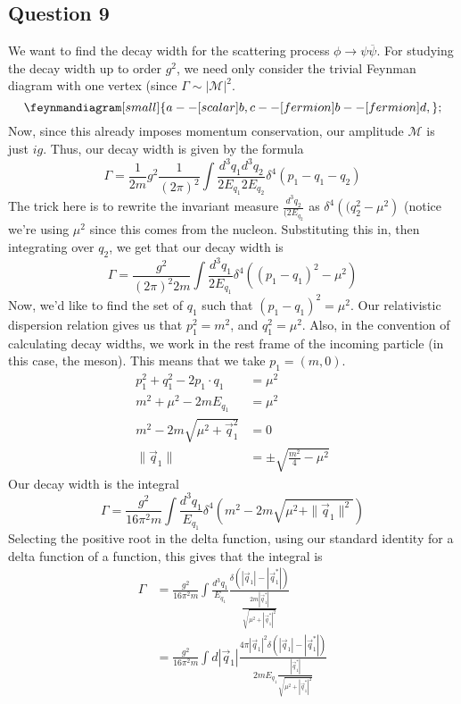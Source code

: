 \subsection{Question 9} 
We want to find the decay width 
for the scattering process $ \phi \to \psi \overline{ \psi } $. 
For studying the decay width up to order $ g ^ 2 $, 
we need only consider the trivial Feynman diagram with 
one vertex (since $ \Gamma \sim | \mathcal{ M } | ^ 2 $.  
\begin{equation*}
\feynmandiagram[small]{
	a -- [scalar] b, 
	c -- [fermion] b -- [fermion] d, 
}; 
\end{equation*}
Now, since this already imposes momentum conservation, 
our amplitude $\mathcal{ M } $ is just $  i g  $.
Thus, our decay width is given by the formula 
\[
\Gamma = \frac{1}{2m } g ^ 2 \frac{1}{( 2 \pi ) ^ 2}  \int 
\frac{d ^ 3 q_1  d ^ 3 q_2 }{ 2 E _{ q_1 } 2 E _{ q_2 } } \delta ^ 4 ( p_1- q_1 - q_2) 
\] The trick here is to 
rewrite the invariant measure $ \frac{ d ^ 3 q_2 }{ ( 2 E_{ q_2 } }$ as $  \delta^ 4 \left(  
( q_2 ^ 2 - \mu ^ 2 \right)  $ (notice we're using $ \mu ^ 2 $ since this 
comes from the nucleon. 
Substituting this in, then integrating over $ q_2 $, 
we get that our decay width is 
\[
\Gamma = \frac{g ^ 2 }{ ( 2 \pi ) ^ 2 2m } \int \frac{d ^ 3 q_1 }{ 2 E_{ q_1 } } \delta ^  4
\left(  ( p_1 - q_1 ) ^ 2  - \mu ^ 2  \right) 
\] Now, we'd like to find the set of $ q_1 $ such that $ ( p_1 - q_1 ) ^ 2  = \mu ^ 2 $. 
Our relativistic dispersion relation gives us that $ p_1 ^ 2 = m ^ 2 $, 
and $q_1 ^ 2 = \mu ^ 2 $. Also, in the convention of calculating 
decay widths, we work in the rest frame of the incoming particle (in this case, 
the meson). This means that we take $ p_1 = ( m , 0 ) $. 
\begin{align*}
p_1 ^ 2 + q_1 ^ 2 - 2 p_1 \cdot  q_1  &=  \mu ^ 2 \\
m ^ 2 + \mu ^ 2  - 2 m E_{ q_1 }  &= \mu ^ 2 \\
m ^ 2  - 2m \sqrt{ \mu ^ 2 + \vec{q} _ 1 ^ 2 } &=  0  \\
\| \vec{q} _ 1 \|  & = \pm \sqrt{ \frac{m ^ 2 }{ 4 }  - \mu ^ 2 } 
\end{align*}
Our decay width is the integral 
\[
\Gamma = \frac{g ^ 2 }{ 16 \pi ^ 2 m } \int \frac{d ^ 3 q_1 }{ E_{ q_1 } } \delta ^ 4 \left(  
m ^ 2- 2m \sqrt{ \mu ^ 2 + \| \vec{q} _ 1 \| ^ 2 } \right) 
\] Selecting the positive root in the delta function, using 
our standard identity for a delta function of a function, this 
gives that the integral is 
\begin{align*} 
\Gamma & = \frac{g ^ 2 }{ 16 \pi ^ 2 m } \int \frac{d ^ 3 q_1 }{ E_{ q_1 } } 
\frac{\delta \left(  | \vec{q} _ 1 |   - | \vec{q} _ 1 ^ * |   \right) }{
 \frac{2m | \vec{q} _ 1 ^ * | }{ \sqrt{ \mu ^ 2 + |\vec{q} _ 1 ^ *  | ^ 2 }  }} \\
 &=  \frac{ g ^ 2 }{ 16 \pi ^ 2 m } \int d |\vec{q} _ 1 | \frac{ 4 \pi | \vec{q} _ 1 | ^ 2 
 \delta ( | \vec{q} _ 1 |  - | \vec{q} _ 1 ^ * | ) }{2m E_{ q _ 1  } \frac{| \vec{q} _ 1 ^ * | }{
\sqrt{ \mu ^ 2 + | \vec{q} _ 1 ^ * | ^ 2 } }} \\
\end{align*} 
